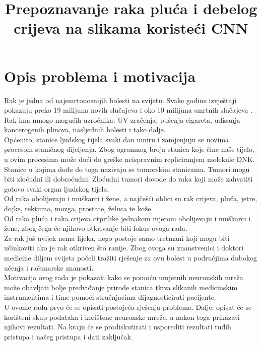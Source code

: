 \documentclass[conference, utf8]{IEEEtran}
\begin{document}
	
	\title{Prepoznavanje raka pluća i debelog crijeva na slikama koristeći CNN}
	
	\author{
		\and
		\and
		\and
		\and
		\and
		}
	
	\maketitle
	
	\section{Opis problema i motivacija}
	Rak je jedna od najsmrtonosnijih bolesti na svijetu. Svake godine izvještaji pokazuju preko 19 milijuna novih slučajeva i oko 10 milijuna smrtnih slučajeva \cite{world2019international}. Rak ima mnogo mogućih uzročnika: UV zračenja, pušenja cigareta, udisanja kancerogenih plinova, nasljednih bolesti i tako dalje.
	\\
	Općenito, stanice ljudskog tijela svaki dan umiru i zamjenjuju se novima procesom staničnog dijeljenja. Zbog ogromnog broja stanica koje čine naše tijelo, u ovim procesima može doći do greške neispravnim repliciranjem molekule DNK.
	\\
	Stanice u kojima dođe do toga nazivaju se tumorskim stanicama. Tumori mogu biti zloćudni ili dobroćudni. Zloćudni tumori dovode do raka koji može zahvatiti gotovo svaki organ ljudskog tijela.
	\\
	Od raka obolijevaju i muškarci i žene, a najčešći oblici su rak crijeva, pluća, jetre, dojke, rektuma, mozga, prostate, želuca te kože.
	\\
	Od raka pluća i raka crijeva otprilike jednakom mjerom obolijevaju i muškarci i žene, zbog čega će njihovo otkrivanje biti fokus ovoga rada.
	\\
	Za rak još uvijek nema lijeka, nego postoje samo tretmani koji mogu biti učinkoviti ako je rak otkriven što ranije.
	Zbog ovoga su znanstvenici i doktori medicine diljem svijeta počeli tražiti rješenje za ovu bolest u područjima dubokog učenja i računarske znanosti.
	\\
	Motivacija ovog rada je pokazati kako se pomoću umjetnih neuronskih mreža može obavljati bolje predviđanje prirode stanica tkiva slikanih medicinskim instrumentima i time pomoći stručnjacima dijagnosticirati pacijente.
	\\
	U ovome radu prvo će se opisati postojeća rješenja problema. Dalje, opisat će se korišteni skup podataka i korištene neuronske mreže, a nakon toga prikazati njihovi rezultati. Na kraju će se prodiskutirati i usporediti rezultati tuđih pristupa i našeg pristupa i dati zaključak.
	
\end{document}
